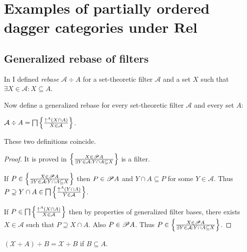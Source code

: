 \section{\texorpdfstring{Examples of partially ordered dagger categories under
$\mathbf{Rel}$}{Examples of partially ordered dagger categories under Rel}}

\subsection{Generalized rebase of filters}

In \cite{volume-1} I defined \emph{rebase} $\mathcal{A} \div A$ for a
set-theoretic filter $\mathcal{A}$ and a set $X$ such that $\exists X \in
\mathcal{A} : X \subseteq A$.

Now define a generalized rebase for every set-theoretic filter $\mathcal{A}$
and every set $A$:

\begin{defn}
  $\mathcal{A} \div A = \bigsqcap \left\{ \frac{ \uparrow^A  (X \cap A) }{ X \in \mathcal{A} }\right\}$.
\end{defn}

\begin{prop}
  These two definitions coincide.
\end{prop}

\begin{proof}
  It is proved in
{\cite{volume-1}} $\left\{ \frac{ X \in \mathscr{P} A }{\exists Y \in \mathcal{A} : Y\cap A \subseteq X }\right\}$ is a filter.

If $P \in \left\{ \frac{ X \in \mathscr{P} A }{ \exists Y
\in \mathcal{A} : Y\cap A \subseteq X }\right\}$ then $P \in \mathscr{P} A$ and $Y\cap A
\subseteq P$ for some $Y \in \mathcal{A}$. Thus $P \supseteq Y \cap A \in
\bigsqcap \left\{ \frac{ \uparrow^A  (Y \cap A) }{ Y \in \mathcal{A} }\right\}$.

If $P \in \bigsqcap \left\{ \frac{ \uparrow^A  (X \cap A) }{
X \in \mathcal{A} }\right\}$ then by properties of generalized filter bases,
there exists $X \in \mathcal{A}$ such that $P \supseteq X \cap A$. Also $P \in
\mathscr{P} A$. Thus $P \in \left\{ \frac{ X \in \mathscr{P} A
}{ \exists Y \in \mathcal{A} : Y\cap A \subseteq X }\right\}$.

\end{proof}

\begin{prop}
  $(\mathcal{X} \div A) \div B = \mathcal{X} \div B$ if $B \subseteq A$.
\end{prop}

